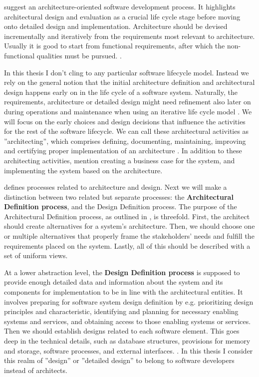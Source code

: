 \documentclass[utf8,english]{gradu3}
\begin{document}
\textcite{Koskimies2005} suggest an architecture-oriented software development
process. It highlights architectural design and evaluation as a crucial life
cycle stage before moving onto detailed design and implementation. Architecture
should be devised incrementally and iteratively from the requirements most
relevant to architecture. Usually it is good to start from functional
requirements, after which the non-functional qualities must be pursued.
\parencite{Koskimies2005}.

In this thesis I don't cling to any particular software lifecycle model.
Instead we rely on the general notion that the initial architecture definition
and architectural design happens early on in the life cycle of a software
system. Naturally, the requirements, architecture or detailed design might need
refinement also later on during operations and maintenance when using an
iterative life cycle model \parencite{IEEE12207}. We will focus on the early
choices and design decisions that influence the activities for the rest of the
software lifecycle. We can call these architectural activities as
''architecting'', which comprises defining, documenting, maintaining, improving
and certifying proper implementation of an architecture
\parencite[3]{IEEE42010}. In addition to these architecting activities,
\textcite[12]{Bass1998} mention creating a business case for the system, and
implementing the system based on the architecture.

\textcite{IEEE12207} defines processes related to architecture and design. Next
we will make a distinction between two related but separate processes: the
\textbf{Architectural Definition process}, and the Design Definition process.
The purpose of the Architectural Definition process, as outlined in
\textcite[66]{IEEE12207}, is threefold. First, the architect should create
alternatives for a system's architecture. Then, we should choose one or
multiple alternatives that properly frame the stakeholders' needs and fulfill
the requirements placed on the system. Lastly, all of this should be described
with a set of uniform views.

At a lower abstraction level, the \textbf{Design Definition process}
\parencite[71]{IEEE12207} is supposed to provide enough detailed data and
information about the system and its components for implementation to be in line
with the architectural entities. It involves preparing for software system
design definition by e.g. prioritizing design principles and characteristic,
identifying and planning for necessary enabling systems and services, and
obtaining access to those enabling systems or services. Then we should establish
designs related to each software element. This goes deep in the technical
details, such as database structures, provisions for memory and storage,
software processes, and external interfaces. \parencite[72]{IEEE12207}. In this
thesis I consider this realm of ''design'' or ''detailed design'' to belong to
software developers instead of architects.
\end{document}
